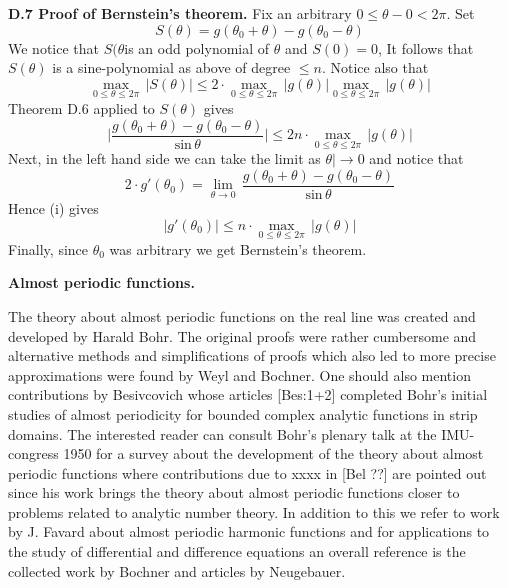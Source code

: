 \documentclass{amsart}
\def\vvv{-}
\begin{document}
{\noindent
{\bf D.7 Proof of Bernstein's theorem.}
Fix an arbitrary $0\leq\theta-0<2\pi$.
Set
\[
S(\theta)=g(\theta_0+\theta)-g(\theta_0-\theta)
\]
We notice that $S(\theta$is an odd polynomial of
$\theta$ and
$S(0)=0$, It follows that
$S(\theta)$ is a sine-polynomial as above of degree
$\leq n$. Notice also that
\[
\max_{0\leq\theta\leq 2\pi}\,|S(\theta)|\leq 2\cdot
\max_{0\leq\theta\leq 2\pi}\,|g(\theta)|
\max_{0\leq\theta\leq 2\pi}\,|g(\theta)|
\]
Theorem D.6 applied to $S(\theta)$ gives
\[
\bigl|\frac{g(\theta_0+\theta)-g(\theta_0-\theta)}{\text{sin}\,\theta}
\bigr|\leq 2n\cdot 
\max_{0\leq\theta\leq 2\pi}\,|g(\theta)|\tag{i}
\]
Next, in the left hand side we can take the limit as $\theta|\to 0$ and notice that
\[
2\cdot  g'(\theta_0)=
\lim_{\theta\to 0}\, 
\frac{g(\theta_0+\theta)-g(\theta_0-\theta)}{\text{sin}\,\theta}
\]
Hence (i) gives
\[
|g'(\theta_0)|\leq n\cdot 
\max_{0\leq\theta\leq 2\pi}\,|g(\theta)|
\]
Finally, since $\theta_0$ was arbitrary we get Bernstein's theorem.











\newpage

\centerline{\bf{Almost periodic functions.}}
\bigskip

\noindent
The theory about almost periodic functions on the real line was created and developed by
Harald  Bohr.
The original proofs were rather cumbersome and 
alternative methods and simplifications of proofs
which also led to more precise approximations
were found by Weyl and Bochner.
One should also mention contributions by
Besivcovich  whose articles
[Bes:1+2]  completed Bohr's
initial studies  of almost periodicity  for bounded complex analytic functions
in strip domains. The interested reader 
can consult Bohr's plenary talk at the IMU\vvv congress
1950 for a survey about the development of the theory about
almost periodic functions where contributions due to 
xxxx in [Bel ??] are pointed out since his work
brings the theory about  almost periodic functions
closer to problems related to analytic number theory.
In addition to this we refer to work by
J. Favard about almost periodic harmonic functions
and for applications to the study of
differential and difference equations
an overall reference is the collected work by Bochner and 
articles by
Neugebauer.
\medskip

}
\end{document}
